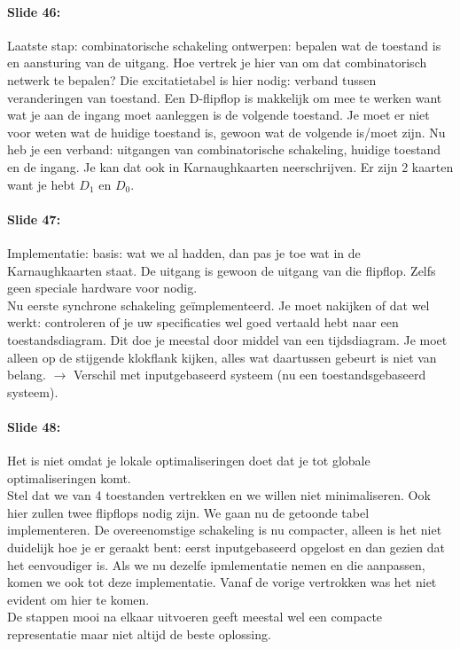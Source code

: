 \documentclass[10pt,a4paper]{book}
\begin{document}
\paragraph{Slide 46:} Laatste stap: combinatorische schakeling ontwerpen: bepalen wat de toestand is en aansturing van de uitgang. Hoe vertrek je hier van om dat combinatorisch netwerk te bepalen? Die excitatietabel is hier nodig: verband tussen veranderingen van toestand. Een D-flipflop is makkelijk om mee te werken want wat je aan de ingang moet aanleggen is de volgende toestand. Je moet er niet voor weten wat de huidige toestand is, gewoon wat de volgende is/moet zijn. Nu heb je een verband: uitgangen van combinatorische schakeling, huidige toestand en de ingang. Je kan dat ook in Karnaughkaarten neerschrijven. Er zijn 2 kaarten want je hebt $D_1$ en $D_0$.

\paragraph{Slide 47:} Implementatie: basis: wat we al hadden, dan pas je toe wat in de Karnaughkaarten staat. De uitgang is gewoon de uitgang van die flipflop. Zelfs geen speciale hardware voor nodig.\\
Nu eerste synchrone schakeling ge\"implementeerd. Je moet nakijken of dat wel werkt: controleren of je uw specificaties wel goed vertaald hebt naar een toestandsdiagram. Dit doe je meestal door middel van een tijdsdiagram. Je moet alleen op de stijgende klokflank kijken, alles wat daartussen gebeurt is niet van belang. $\rightarrow$ Verschil met inputgebaseerd systeem (nu een toestandsgebaseerd systeem).

\paragraph{Slide 48:} Het is niet omdat je lokale optimaliseringen doet dat je tot globale optimaliseringen komt.\\
Stel dat we van 4 toestanden vertrekken en we willen niet minimaliseren. Ook hier zullen twee flipflops nodig zijn. We gaan nu de getoonde tabel implementeren. De overeenomstige schakeling is nu compacter, alleen is het niet duidelijk hoe je er geraakt bent: eerst inputgebaseerd opgelost en dan gezien dat het eenvoudiger is. Als we nu dezelfe ipmlementatie nemen en die aanpassen, komen we ook tot deze implementatie. Vanaf de vorige vertrokken was het niet evident om hier te komen.\\
De stappen mooi na elkaar uitvoeren geeft meestal wel een compacte representatie maar niet altijd de beste oplossing.
\end{document}
